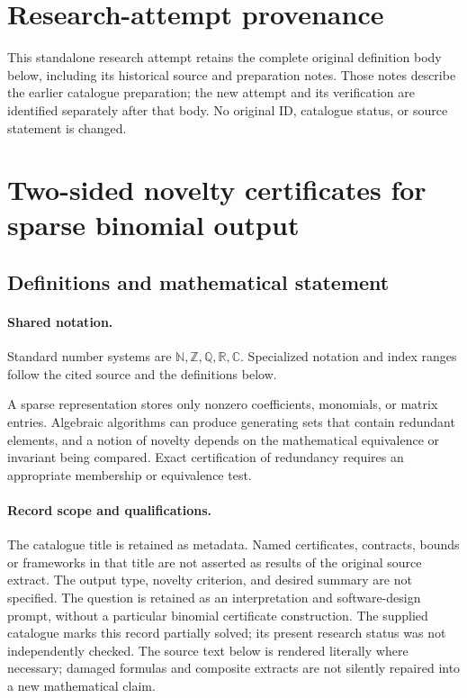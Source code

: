 \documentclass[11pt]{article}
\begin{document}
\section*{Research-attempt provenance}
This standalone research attempt retains the complete original definition body below,
including its historical source and preparation notes. Those notes describe the
earlier catalogue preparation; the new attempt and its verification are identified
separately after that body. No original ID, catalogue status, or source statement is changed.

\section{Two-sided novelty certificates for sparse binomial output}\label{statement}

\subsection{Definitions and mathematical statement}

\paragraph{Shared notation.}Standard number systems are $\mathbb N,\mathbb Z,\mathbb Q,\mathbb R,\mathbb C$. Specialized notation and index ranges follow the cited source and the definitions below.


A sparse representation stores only nonzero coefficients, monomials, or matrix entries. Algebraic algorithms can produce generating sets that contain redundant elements, and a notion of novelty depends on the mathematical equivalence or invariant being compared. Exact certification of redundancy requires an appropriate membership or equivalence test.
\paragraph{Record scope and qualifications.}
The catalogue title is retained as metadata. Named certificates, contracts, bounds or frameworks in that title are not asserted as results of the original source extract.
The output type, novelty criterion, and desired summary are not specified. The question is retained as an interpretation and software-design prompt, without a particular binomial certificate construction. The supplied catalogue marks this record partially solved; its present research status was not independently checked.
The source text below is rendered literally where necessary; damaged formulas and composite extracts are not silently repaired into a new mathematical claim.
\end{document}
